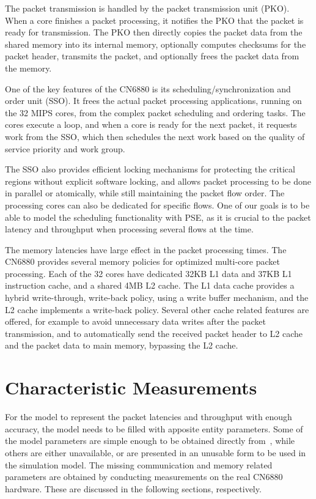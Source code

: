 The packet transmission is handled by the packet transmission unit (PKO). When a core finishes a packet processing, it notifies the PKO that the packet is ready for transmission. The PKO then directly copies the packet data from the shared memory into its internal memory, optionally computes checksums for the packet header, transmits the packet, and optionally frees the packet data from the memory.~\cite{cavium:2010:fundamentals}

One of the key features of the CN6880 is its scheduling/synchronization and order unit (SSO). It frees the actual packet processing applications, running on the 32 MIPS cores, from the complex packet scheduling and ordering tasks. The cores execute a loop, and when a core is ready for the next packet, it requests work from the SSO, which then schedules the next work based on the quality of service priority and work group.~\cite{cavium:2010:fundamentals}

The SSO also provides efficient locking mechanisms for protecting the critical regions without explicit software locking, and allows packet processing to be done in parallel or atomically, while still maintaining the packet flow order. The processing cores can also be dedicated for specific flows. One of our goals is to be able to model the scheduling functionality with PSE, as it is crucial to the packet latency and throughput when processing several flows at the time.~\cite{cavium:2010:fundamentals}

The memory latencies have large effect in the packet processing times. The CN6880 provides several memory policies for optimized multi-core packet processing. Each of the 32 cores have dedicated 32KB L1 data and 37KB L1 instruction cache, and a shared 4MB L2 cache. The L1 data cache provides a hybrid write-through, write-back policy, using a write buffer mechanism, and the L2 cache implements a write-back policy. Several other cache related features are offered, for example to avoid unnecessary data writes after the packet transmission, and to automatically send the received packet header to L2 cache and the packet data to main memory, bypassing the L2 cache.~\cite{cavium:2010:fundamentals}

\section{Characteristic Measurements}
\label{sec:characteristic-measurements}

For the model to represent the packet latencies and throughput with enough accuracy, the model needs to be filled with apposite entity parameters. Some of the model parameters are simple enough to be obtained directly from~\cite{cavium:2010:fundamentals}, while others are either unavailable, or are presented in an unusable form to be used in the simulation model. The missing communication and memory related parameters are obtained by conducting measurements on the real CN6880 hardware. These are discussed in the following sections, respectively.

